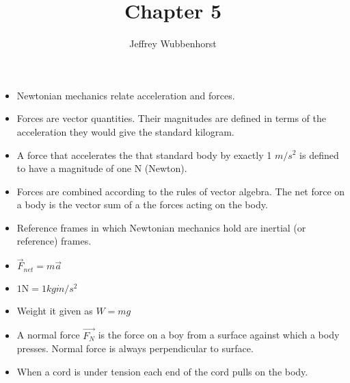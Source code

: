 \documentclass[10pt,letterpaper]{article}
\author{Jeffrey Wubbenhorst}
\title{Chapter 5}
\begin{document}
\maketitle


\begin{itemize}
\item Newtonian mechanics relate acceleration and forces. 
\item Forces are vector quantities. Their magnitudes are defined in terms of the acceleration they would give the standard kilogram. 
\item A force that accelerates the that standard body by exactly 1 $m/s^2$ is defined to have a magnitude of one N (Newton). 

\item Forces are combined according to the rules of vector algebra. The net force on a body is the vector sum of a the forces acting on the body. 
\item Reference frames in which Newtonian mechanics hold are inertial (or reference) frames. 
\item $\vec{F}_{net}=m\vec{a}$ 
\item $1 \mbox{N}=1 kg\dot m/s^2$

\item Weight it given as $W=mg$ 
 \item A normal force $\vec{F_N}$ is the force on a boy from a surface against which a body presses. Normal force is always perpendicular to surface. 
 \item When a cord is under tension each end of the cord pulls on the body. 
 


\end{itemize}
\end{document}
